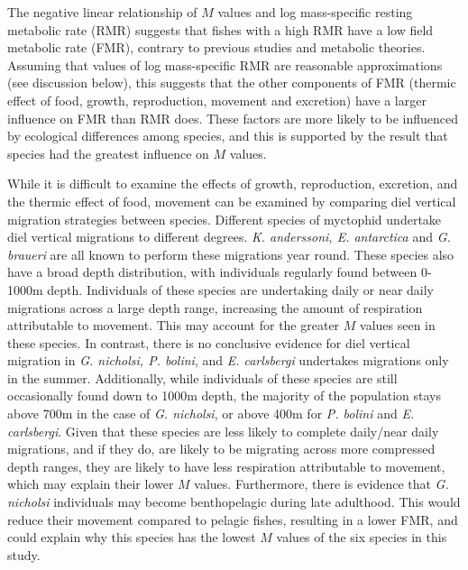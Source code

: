\documentclass[12pt, titlepage]{article}
\begin{document}
The negative linear relationship of $M$ values and log mass-specific resting metabolic rate (RMR) suggests that fishes with a high RMR have a low field metabolic rate (FMR), contrary to previous studies and metabolic theories. %
Assuming that values of log mass-specific RMR are reasonable approximations (see discussion below), this suggests that the other components of FMR (thermic effect of food, growth, reproduction, movement and excretion) have a larger influence on FMR than RMR does.
These factors are more likely to be influenced by ecological differences among species, and this is supported by the result that species had the greatest influence on $M$ values.

While it is difficult to examine the effects of growth, reproduction, excretion, and the thermic effect of food, movement can be examined by comparing diel vertical migration strategies between species.
Different species of myctophid undertake diel vertical migrations to different degrees. %
\textit{K. anderssoni, E. antarctica} and \textit{G. braueri} are all known to perform these migrations year round.
These species also have a broad depth distribution, with individuals regularly found between 0-1000m depth.
Individuals of these species are undertaking daily or near daily migrations across a large depth range, increasing the amount of respiration attributable to movement.
This may account for the greater $M$ values seen in these species.
In contrast, there is no conclusive evidence for diel vertical migration in \textit{G. nicholsi, P. bolini}, and \textit{E. carlsbergi} undertakes migrations only in the summer.
Additionally, while individuals of these species are still occasionally found down to 1000m depth, the majority of the population stays above 700m in the case of \textit{G. nicholsi}, or above 400m for \textit{P. bolini} and \textit{E. carlsbergi}.
Given that these species are less likely to complete daily/near daily migrations, and if they do, are likely to be migrating across more compressed depth ranges, they are likely to have less respiration attributable to movement, which may explain their lower $M$ values.
Furthermore, there is evidence that \textit{G. nicholsi} individuals may become benthopelagic during late adulthood.
This would reduce their movement compared to pelagic fishes, resulting in a lower FMR, and could explain why this species has the lowest $M$ values of the six species in this study.
\end{document}
